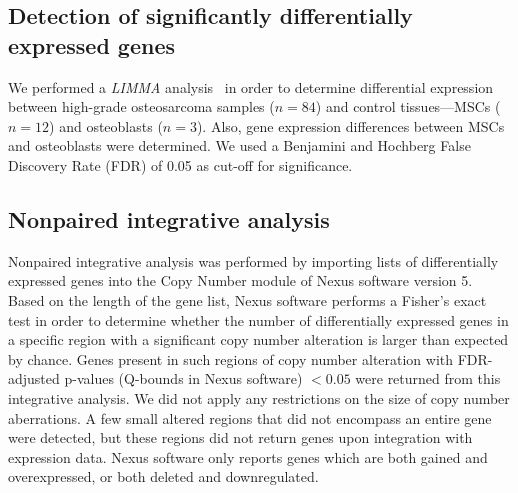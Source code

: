 \subsection{Detection of significantly differentially expressed genes}
We performed a {\it LIMMA} analysis~\cite{smyth2004linear}
in order to determine differential expression
between high\hyp{}grade osteosarcoma samples ($n=84$)
and control tissues---MSCs ($n=12$) and osteoblasts
($n=3$). Also, gene expression differences between
MSCs and osteoblasts were determined. We used a
Benjamini and Hochberg False Discovery Rate
(FDR) of 0.05 as cut-off for significance.

\subsection{Nonpaired integrative analysis}
Nonpaired integrative analysis was performed
by importing lists of differentially expressed
genes into the Copy Number module of Nexus
software version 5. Based on the length of the
gene list, Nexus software performs a Fisher's
exact test in order to determine whether the
number of differentially expressed genes in a
specific region with a significant copy number
alteration is larger than expected by chance.
Genes present in such regions of copy number
alteration with FDR\hyp{}adjusted p-values (Q-bounds
in Nexus software) $<0.05$ were returned from
this integrative analysis. We did not apply any
restrictions on the size of copy number aberrations.
A few small altered regions that did not
encompass an entire gene were detected, but
these regions did not return genes upon integration
with expression data. Nexus software only
reports genes which are both gained and overexpressed,
or both deleted and downregulated.

